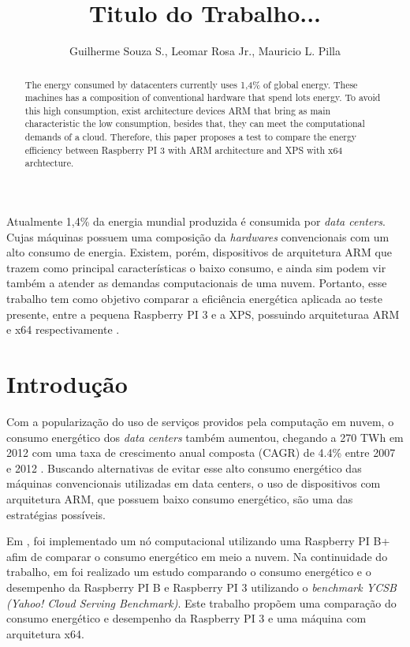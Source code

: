 \documentclass[12pt]{article}
\title{Titulo do Trabalho...}
\author{Guilherme Souza S.\inst{1}, Leomar Rosa Jr.\inst{1}, Mauricio L. Pilla\inst{1} }
\begin{document}
 
\maketitle

\begin{abstract}
  The energy consumed by datacenters currently uses 1,4\% of global energy. %
  These machines has a composition of conventional hardware that spend lots energy. 
  To avoid this high consumption, exist architecture devices ARM that bring as main characteristic the low consumption, besides that, they can meet the computational demands of a cloud. 
  Therefore, this paper proposes a test to compare the energy efficiency between Raspberry PI 3 with ARM architecture and XPS with x64 archtecture. 
\end{abstract}
     
\begin{resumo} 
  Atualmente 1,4\% da energia mundial produzida é consumida por \textit{data centers}. Cujas máquinas possuem uma composição da \textit{hardwares} convencionais com um alto consumo de energia. Existem, porém, dispositivos de arquitetura ARM que trazem como principal características o baixo consumo, e ainda sim podem vir também a atender as demandas computacionais de uma nuvem. Portanto, esse trabalho tem como objetivo comparar a eficiência energética aplicada ao teste presente, entre a pequena Raspberry PI 3 e a XPS, possuindo arquiteturaa ARM e x64 respectivamente .
\end{resumo}


\section{Introdução}
  Com a popularização do uso de serviços providos pela computação em nuvem, o consumo energético dos \textit{data centers} também aumentou, chegando a 270 TWh em 2012 com uma taxa de crescimento anual composta (CAGR) de 4.4\% entre 2007 e 2012 \cite{VanHeddeghem:2014:TWI:2657027.2657141}. Buscando alternativas de evitar esse alto consumo energético das máquinas convencionais utilizadas em data centers, o uso de dispositivos com arquitetura ARM, que possuem baixo consumo energético, são uma das estratégias possíveis.


  Em \cite{Joao}, foi implementado um nó computacional utilizando uma Raspberry PI B+ afim de comparar o consumo energético em meio a nuvem.
  Na continuidade do trabalho, em \cite{eu} foi realizado um estudo comparando o consumo energético e o desempenho da Raspberry PI B e Raspberry PI 3 utilizando o \textit{benchmark YCSB (Yahoo! Cloud Serving Benchmark)}\cite{Git}. Este trabalho propõem uma comparação do consumo energético e desempenho da Raspberry PI 3 e uma máquina com arquitetura x64. 
  
\end{document}
